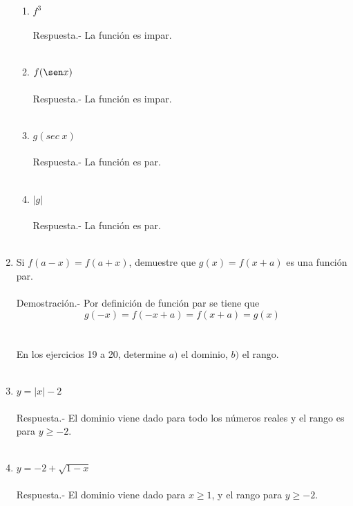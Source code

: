 \begin{enumerate}[\bfseries 1.]
\begin{enumerate}[\bfseries a)]
    \item $f^3$\\\\
	Respuesta.-\; La función es impar.\\\\

    \item $f(\sen x)$\\\\
	Respuesta.-\; La función es impar.\\\\

    \item $g(sec \; x)$\\\\
	Respuesta.-\; La función es par.\\\\

    \item $|g|$\\\\
	Respuesta.-\; La función es par.\\\\

\end{enumerate}

\item Si $f(a-x) = f(a+x)$, demuestre que $g(x)=f(x+a)$ es una función par.\\\\
    Demostración.-\; Por definición de función par se tiene que 
    $$g(-x) = f(-x+a) = f(x+a) = g(x)$$\\\\

En los ejercicios 19 a 20, determine $a)$ el dominio, $b)$ el rango.\\\\

\item $y=|x|-2$\\\\
    Respuesta.-\; El dominio viene dado para todo los números reales y el rango es para $y\geq -2$.\\\\

\item $y=-2 + \sqrt{1-x}$\\\\
    Respuesta.-\; El dominio viene dado para $x\geq 1$, y el rango para $y\geq -2$.\\\\


\end{enumerate}
